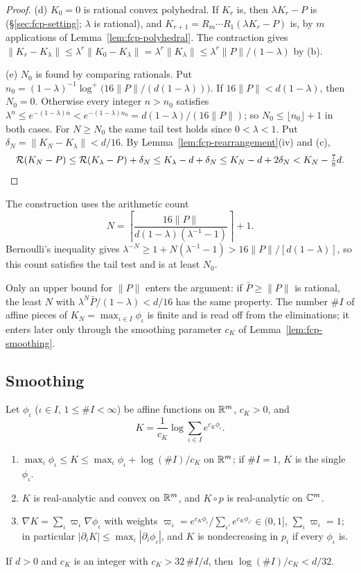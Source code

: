 \begin{proof}
(d) $K_0=0$ is rational convex polyhedral. If $K_r$ is, then $\lambda K_r-P$ is (\S\ref{sec:fcp-setting}; $\lambda$
is rational), and $K_{r+1}=R_m\cdots R_1(\lambda K_r-P)$ is, by $m$ applications of Lemma~\ref{lem:fcp-polyhedral}. The
contraction gives
$\|K_r-K_\lambda\|\le\lambda^r\|K_0-K_\lambda\|=\lambda^r\|K_\lambda\|\le\lambda^r\|P\|/(1-\lambda)$ by (b).

(e) $N_0$ is found by comparing rationals. Put $n_0=(1-\lambda)^{-1}\log^+\bigl(16\|P\|/(d(1-\lambda))\bigr)$. If
$16\|P\|<d(1-\lambda)$, then $N_0=0$. Otherwise every integer $n>n_0$ satisfies
$\lambda^n\le e^{-(1-\lambda)n}<e^{-(1-\lambda)n_0}=d(1-\lambda)/(16\|P\|)$; so $N_0\le\lfloor n_0\rfloor+1$ in both cases.
For $N\ge N_0$ the same tail test holds since $0<\lambda<1$.
Put $\delta_N=\|K_N-K_\lambda\|<d/16$. By Lemma~\ref{lem:fcp-rearrangement}(iv) and (c),
\[
 \mathcal{R}(K_N-P)\le\mathcal{R}(K_\lambda-P)+\delta_N\le K_\lambda-d+\delta_N\le K_N-d+2\delta_N<K_N-\tfrac78d .\qedhere
\]
\end{proof}

The construction uses the arithmetic count
\[
 N=\left\lceil\frac{16\|P\|}{d(1-\lambda)(\lambda^{-1}-1)}\right\rceil+1.
\]
Bernoulli's inequality gives $\lambda^{-N}\ge1+N(\lambda^{-1}-1)>16\|P\|/[d(1-\lambda)]$,
so this count satisfies the tail test and is at least $N_0$.

Only an upper bound for $\|P\|$ enters the argument: if $\bar P\ge\|P\|$ is rational, the least $N$ with
$\lambda^N\bar P/(1-\lambda)<d/16$ has the same property. The number $\#I$ of affine pieces of $K_N=\max_{\iota\in
I}\phi_\iota$ is finite and is read off from the eliminations; it enters later only through the smoothing parameter
$c_K$ of Lemma~\ref{lem:fcp-smoothing}.

\subsection{Smoothing}\label{sec:fcp-smoothing}

\begin{lemma}\label{lem:fcp-smoothing}
Let $\phi_\iota$ ($\iota\in I$, $1\le\#I<\infty$) be affine functions on $\mathbb{R}^m$, $c_K>0$, and
\[
 K=\frac1{c_K}\log\sum_{\iota\in I}e^{c_K\phi_\iota}.
\]
\begin{enumerate}[label=(\alph*)]
\item $\max_\iota\phi_\iota\le K\le\max_\iota\phi_\iota+\log(\#I)/c_K$ on $\mathbb{R}^m$; if $\#I=1$, $K$ is the single
 $\phi_\iota$.
\item $K$ is real-analytic and convex on $\mathbb{R}^m$, and $K\circ p$ is real-analytic on $\mathbb{C}^m$.
\item $\nabla K=\sum_\iota\varpi_\iota\nabla\phi_\iota$ with weights
 $\varpi_\iota=e^{c_K\phi_\iota}/\sum_{\iota'}e^{c_K\phi_{\iota'}}\in(0,1]$, $\sum_\iota\varpi_\iota=1$; in particular
 $|\partial_iK|\le\max_\iota|\partial_i\phi_\iota|$, and $K$ is nondecreasing in $p_i$ if every $\phi_\iota$ is.
\end{enumerate}
If $d>0$ and $c_K$ is an integer with $c_K>32\,\#I/d$, then $\log(\#I)/c_K<d/32$.
\end{lemma}

